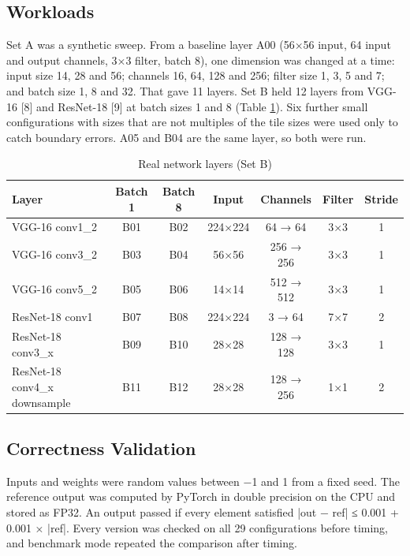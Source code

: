 \documentclass[12pt,a4paper]{article}
\begin{document}
\subsection{Workloads}
Set A was a synthetic sweep. From a baseline layer A00 (56×56 input, 64 input and output channels, 3×3 filter, batch 8), one dimension was changed at a time: input size 14, 28 and 56; channels 16, 64, 128 and 256; filter size 1, 3, 5 and 7; and batch size 1, 8 and 32. That gave 11 layers. Set B held 12 layers from VGG-16 [8] and ResNet-18 [9] at batch sizes 1 and 8 (Table \ref{tab:setB}). Six further small configurations with sizes that are not multiples of the tile sizes were used only to catch boundary errors. A05 and B04 are the same layer, so both were run.

\begin{table}[H]\centering\small
\begin{tabular}{lcccccc}
\hline
\rowcolor{headgrey}\textbf{Layer} & \textbf{Batch 1} & \textbf{Batch 8} & \textbf{Input} & \textbf{Channels} & \textbf{Filter} & \textbf{Stride} \\ \hline
VGG-16 conv1\_2 & B01 & B02 & 224×224 & 64 → 64 & 3×3 & 1 \\
VGG-16 conv3\_2 & B03 & B04 & 56×56 & 256 → 256 & 3×3 & 1 \\
VGG-16 conv5\_2 & B05 & B06 & 14×14 & 512 → 512 & 3×3 & 1 \\
ResNet-18 conv1 & B07 & B08 & 224×224 & 3 → 64 & 7×7 & 2 \\
ResNet-18 conv3\_x & B09 & B10 & 28×28 & 128 → 128 & 3×3 & 1 \\
ResNet-18 conv4\_x downsample & B11 & B12 & 28×28 & 128 → 256 & 1×1 & 2 \\
\hline
\end{tabular}
\caption{Real network layers (Set B)}\label{tab:setB}
\end{table}

\subsection{Correctness Validation}
Inputs and weights were random values between −1 and 1 from a fixed seed. The reference output was computed by PyTorch in double precision on the CPU and stored as FP32. An output passed if every element satisfied |out − ref| ≤ 0.001 + 0.001 × |ref|. Every version was checked on all 29 configurations before timing, and benchmark mode repeated the comparison after timing.
\end{document}
